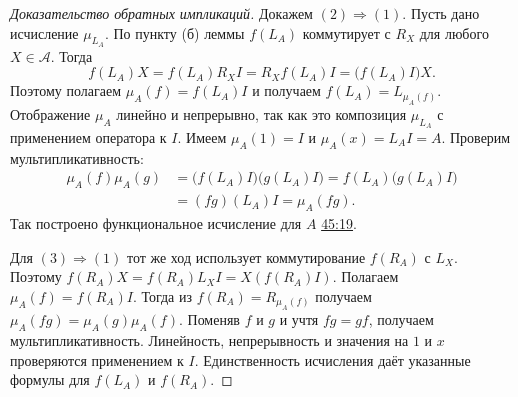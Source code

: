 \documentclass[11pt,a4paper]{article}
\theoremstyle{plain}
\theoremstyle{definition}
\newcommand{\id}{I}
\newcommand{\at}[3]{\href{https://www.youtube.com/watch?v=#1&t=#2s}{#3}}
\begin{document}
\begin{proof}[Доказательство обратных импликаций]
Докажем $(2)\Rightarrow(1)$. Пусть дано исчисление
$\mu_{L_A}$. По пункту (б) леммы $f(L_A)$ коммутирует
с $R_X$ для любого $X\in\mathcal A$. Тогда
\[
 f(L_A)X=f(L_A)R_X\id
         =R_Xf(L_A)\id=\bigl(f(L_A)\id\bigr)X.
\]
Поэтому полагаем $\mu_A(f)=f(L_A)\id$ и получаем
$f(L_A)=L_{\mu_A(f)}$. Отображение $\mu_A$ линейно
и непрерывно, так как это композиция $\mu_{L_A}$
с применением оператора к $\id$. Имеем
$\mu_A(1)=\id$ и $\mu_A(x)=L_A\id=A$. Проверим мультипликативность:
\[
 \begin{aligned}
 \mu_A(f)\mu_A(g)
   &=\bigl(f(L_A)\id\bigr)\bigl(g(L_A)\id\bigr)
   =f(L_A)\bigl(g(L_A)\id\bigr)\\
   &=(fg)(L_A)\id=\mu_A(fg).
 \end{aligned}
\]
Так построено функциональное исчисление для $A$
\at{8kQuUxC-VVg}{2719}{45:19}.

Для $(3)\Rightarrow(1)$ тот же ход использует
коммутирование $f(R_A)$ с $L_X$. Поэтому
$f(R_A)X=f(R_A)L_X\id=X(f(R_A)\id)$. Полагаем
$\mu_A(f)=f(R_A)\id$. Тогда из
$f(R_A)=R_{\mu_A(f)}$ получаем
$\mu_A(fg)=\mu_A(g)\mu_A(f)$. Поменяв $f$ и $g$ и
учтя $fg=gf$, получаем мультипликативность.
Линейность, непрерывность и значения на $1$ и $x$
проверяются применением к $\id$. Единственность
исчисления даёт указанные формулы для $f(L_A)$ и $f(R_A)$.
\end{proof}
\end{document}
